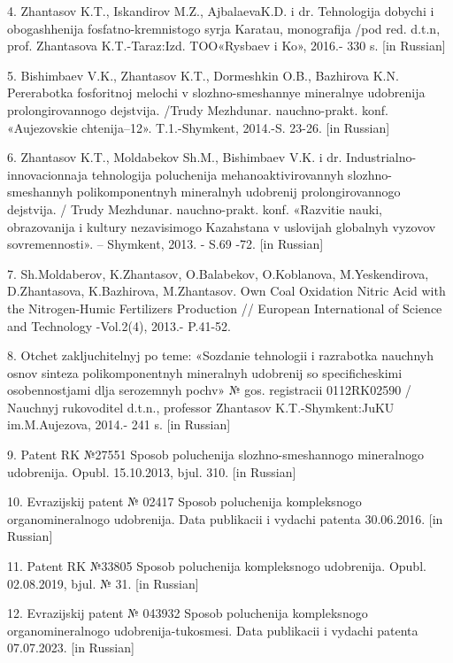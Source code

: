 4. Zhantasov K.T., Iskandirov M.Z., AjbalaevaK.D. i dr. Tehnologija
dobychi i obogashhenija fosfatno-kremnistogo syr\textquotesingle ja
Karatau, monografija /pod red. d.t.n, prof. Zhantasova K.T.-Taraz:Izd.
TOO«Rysbaev i Ko», 2016.- 330 s. {[}in Russian{]}

5. Bishimbaev V.K., Zhantasov K.T., Dormeshkin O.B., Bazhirova K.N.
Pererabotka fosforitnoj melochi v slozhno-smeshannye
mineral\textquotesingle nye udobrenija prolongirovannogo dejstvija.
/Trudy Mezhdunar. nauchno-prakt. konf. «Aujezovskie chtenija--12».
T.1.-Shymkent, 2014.-S. 23-26. {[}in Russian{]}

6. Zhantasov K.T., Moldabekov Sh.M., Bishimbaev V.K. i dr.
Industrial\textquotesingle no-innovacionnaja tehnologija poluchenija
mehanoaktivirovannyh slozhno-smeshannyh polikomponentnyh
mineral\textquotesingle nyh udobrenij prolongirovannogo dejstvija. /
Trudy Mezhdunar. nauchno-prakt. konf. «Razvitie nauki, obrazovanija i
kul\textquotesingle tury nezavisimogo Kazahstana v uslovijah
global\textquotesingle nyh vyzovov sovremennosti». -- Shymkent, 2013. -
S.69 -72. {[}in Russian{]}

7. Sh.Moldaberov, K.Zhantasov, O.Balabekov, O.Koblanova, M.Yeskendirova,
D.Zhantasova, K.Bazhirova, M.Zhantasov. Own Coal Oxidation Nitric Acid
with the Nitrogen-Humic Fertilizers Production // European International
of Science and Technology -Vol.2(4), 2013.- P.41-52.

8. Otchet zakljuchitel\textquotesingle nyj po teme: «Sozdanie tehnologii
i razrabotka nauchnyh osnov sinteza polikomponentnyh
mineral\textquotesingle nyh udobrenij so specificheskimi osobennostjami
dlja serozemnyh pochv» № gos. registracii 0112RK02590 / Nauchnyj
rukovoditel\textquotesingle{} d.t.n., professor Zhantasov
K.T.-Shymkent:JuKU im.M.Aujezova, 2014.- 241 s. {[}in Russian{]}

9. Patent RK №27551 Sposob poluchenija slozhno-smeshannogo
mineral\textquotesingle nogo udobrenija. Opubl. 15.10.2013, bjul. 310.
{[}in Russian{]}

10. Evrazijskij patent № 02417 Sposob poluchenija kompleksnogo
organomineral\textquotesingle nogo udobrenija. Data publikacii i vydachi
patenta 30.06.2016. {[}in Russian{]}

11. Patent RK №33805 Sposob poluchenija kompleksnogo udobrenija. Opubl.
02.08.2019, bjul. № 31. {[}in Russian{]}

12. Evrazijskij patent № 043932 Sposob poluchenija kompleksnogo
organomineral\textquotesingle nogo udobrenija-tukosmesi. Data publikacii
i vydachi patenta 07.07.2023. {[}in Russian{]}

